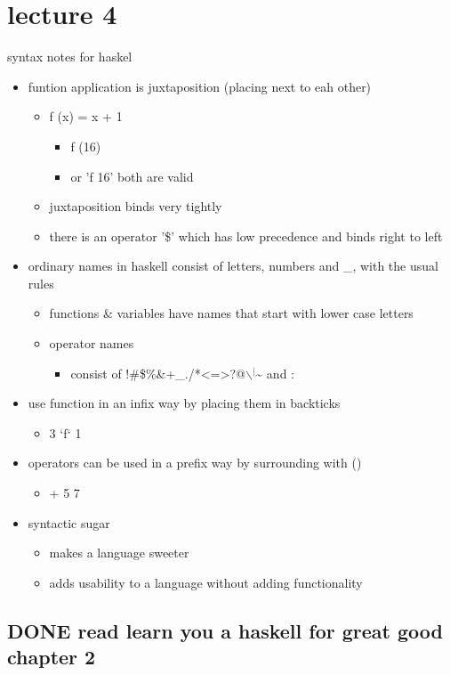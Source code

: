 \documentclass[11pt]{article}
\begin{document}
\section{lecture 4}
\label{sec-3}
syntax notes for haskel
\begin{itemize}
\item funtion application is juxtaposition (placing next to eah other)
\begin{itemize}
\item f (x) = x + 1
\begin{itemize}
\item f (16)
\item or 'f 16' both are valid
\end{itemize}
\item juxtaposition binds very tightly
\item there is an operator '\$' which has low precedence and binds right to left
\end{itemize}
\item ordinary names in haskell consist of letters, numbers and \_, with the usual rules
\begin{itemize}
\item functions \& variables have names that start with lower case letters
\item operator names
\begin{itemize}
\item consist of !\#\$\%\&+\_./*<=>?@$\backslash$$^{\text{|}}$\textasciitilde{} and :
\end{itemize}
\end{itemize}
\item use function in an infix way by placing them in backticks
\begin{itemize}
\item 3 `f` 1
\end{itemize}
\item operators can be used in a prefix way by surrounding with ()
\begin{itemize}
\item + 5 7
\end{itemize}
\item syntactic sugar
\begin{itemize}
\item makes a language sweeter
\item adds usability to a language without adding functionality
\end{itemize}
\end{itemize}
\subsection{{\bfseries\sffamily DONE} read learn you a haskell for great good chapter 2}
\label{sec-3-1}
\end{document}
